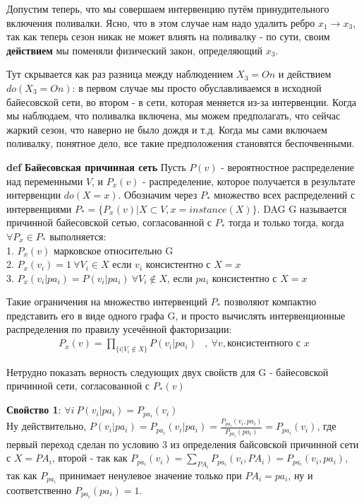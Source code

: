 \documentclass[fleqn]{article}
\def\define#1{\textbf{def} \textbf{#1}}
\begin{document}
Допустим теперь, что мы совершаем интервенцию путём принудительного включения поливалки. Ясно, что в этом случае нам надо удалить ребро $x_1 \rightarrow x_3$, так как теперь сезон никак не может влиять на поливалку - по сути, своим \textbf{действием} мы поменяли физический закон, определяющий $x_3$. 

Тут скрывается как раз разница между наблюдением  $X_3=On$ и действием $do(X_3 = On)$: в первом случае мы просто обуславливаемся в исходной байесовской сети, во втором - в сети, которая меняется из-за интервенции. Когда мы наблюдаем, что поливалка включена, мы можем предполагать, что сейчас жаркий сезон, что наверно не было дождя и т.д. Когда мы сами включаем поливалку, понятное дело, все такие предположения становятся беспочвенными.

\define{Байесовская причинная сеть} Пусть $P(v)$ - вероятностное распределение над переменными $V$, и $P_x(v)$ - распределение, которое получается в результате интервенции $do(X=x)$. Обозначим через $P_*$ множество всех распределений с интервенциями $P_* = \{P_x(v)| X \subset V, x = instance(X)\}$. DAG G называется причинной байесовской сетью, согласованной с $P_*$ тогда и только тогда, когда $\forall P_x \in P_*$ выполняется:\\
1. $P_x(v)$ марковское относительно G\\
2. $P_x(v_i) = 1 \ \forall V_i \in X$ если $v_i$ консистентно с $X=x$ \\
3. $P_x(v_i|pa_i) = P(v_i|pa_i) \ \forall V_i \notin X$, если $pa_i$ консистентно с $X=x$

Такие ограничения на множество интервенций $P_*$ позволяют компактно представить его в виде одного графа G, и просто вычислять интервенционные распределения по правилу усечённой факторизации:
\begin{align}
	P_x(v) = \prod\limits_{\{i|V_i \notin X\}}P(v_i|pa_i) &, \ \forall v, \text{консистентного с } x
\end{align} 

Нетрудно показать верность следующих двух свойств для G - байесовской причинной сети, согласованной с $P_*(v)$

\textbf{Свойство 1}: $\forall i \ P(v_i|pa_i) = P_{pa_i}(v_i)$\\
Ну действительно, $P(v_i|pa_i) = P_{pa_i}(v_i|pa_i) = \frac{P_{pa_i}(v_i, pa_i)}{P_{pa_i}(pa_i)} = P_{pa_i}(v_i)$, где первый переход сделан по условию 3 из определения байсовской  причинной сети с $X = PA_i$, второй - так как $P_{pa_i}(v_i) = \sum\limits_{PA_i}P_{pa_i}(v_i, PA_i) = P_{pa_i}(v_i, pa_i)$, так как $P_{pa_i}$ принимает ненулевое значение только при $PA_i = pa_i$, ну и соответственно $P_{pa_i}(pa_i) = 1$.
\end{document}
